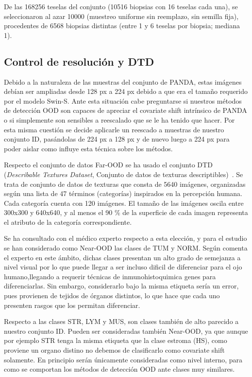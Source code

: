 De las \num{168256} teselas del conjunto (\num{10516} biopsias con 16 teselas cada una), se seleccionaron al azar \num{10000} (muestreo uniforme sin reemplazo, sin semilla fija), procedentes de \num{6568} biopsias distintas (entre 1 y 6 teselas por biopsia; mediana 1).

\subsection{Control de resolución y DTD}\label{sec:control-dtd}
Debido a la naturaleza de las muestras del conjunto de PANDA, estas imágenes debían ser ampliadas desde 128 px a 224 px debido a que era el tamaño requerido por el modelo Swin-S.
Ante esta situación cabe preguntarse si nuestros métodos de detección OOD son capaces de apreciar el covariate shift intrínsico de PANDA o si simplemente
son sensibles a reescalado que se le ha tenido que hacer. Por esta misma cuestión se decide aplicarle un reescado a muestras de nuestro conjunto ID, pasándolas de 224 px a 128 px y de nuevo luego a 224 px 
para poder aislar como influye esta técnica sobre los métodos.

Respecto el conjunto de datos Far-OOD se ha usado el conjunto DTD (\textit{Describable Textures Dataset}, Conjunto de datos de texturas descriptibles)~\cite{cimpoi2014}. Se trata de conjunto de datos de texturas que consta de 5640 imágenes, organizadas según una lista de 47 términos (categorías)
 inspirados en la percepción humana. Cada categoría cuenta con 120 imágenes. El tamaño de las imágenes oscila entre 300x300 y 640x640, y al menos el 90 \% de la superficie de cada imagen representa el atributo de la categoría correspondiente.

Se ha consultado con el médico experto respecto a esta elección, y para el estudio se han considerado como Near-OOD las clases de
TUM y NORM. Según comenta el experto en este ámbito, dichas clases presentan un alto grado de semejanza a nivel visual por lo que puede llegar a ser incluso 
dificil de diferenciar para el ojo humano,llegando a requerir técnicas de inmunohistoquimica genes para diferenciarlas. Sin embargo, 
considerarlo bajo la misma etiqueta sería un error, pues provienen de tejidos de órganos distintos, lo que hace que cada uno presenten rasgos que los permitan diferenciar.

Respecto a las clases STR, LYM y MUS, son clases también de alto parecido a nuestro conjunto ID. Pueden ser consideradas también Near-OOD, ya que aunque por ejemplo STR tenga la misma 
etiqueta que la clase estroma (HS), como proviene un organo distino no debemos de clasificarlo como covariate shift solamente. En principio serán únicamente consideradas como nivel interno, para 
como se comportan los métodos de detección OOD ante clases muy similares.


